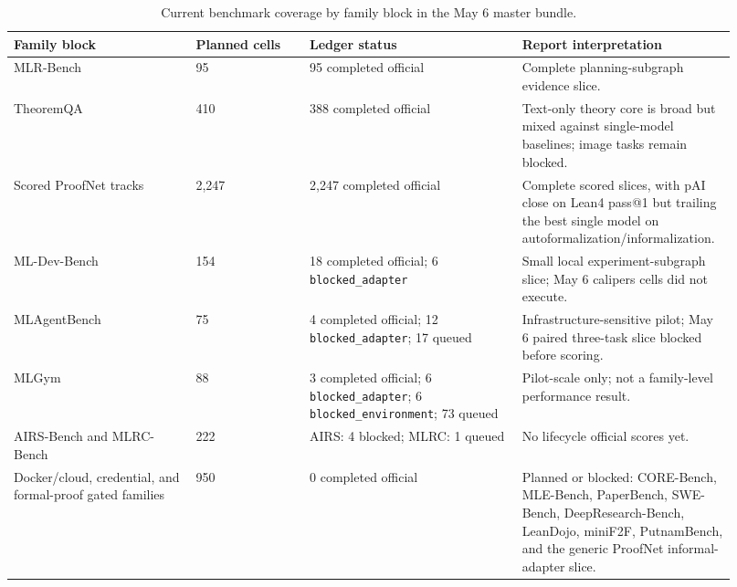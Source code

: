 \documentclass{article}
\begin{document}
\begin{table}[h]
\centering
\caption{Current benchmark coverage by family block in the May 6 master bundle.}
\label{tab:benchmark_coverage}
\small
\setlength{\tabcolsep}{3pt}
\begin{tabular}{@{}p{0.24\linewidth}p{0.15\linewidth}p{0.29\linewidth}p{0.24\linewidth}@{}}
\toprule
\textbf{Family block} & \textbf{Planned cells} & \textbf{Ledger status} & \textbf{Report interpretation} \\
\midrule
MLR-Bench & 95 & 95 completed official & Complete planning-subgraph evidence slice. \\
TheoremQA & 410 & 388 completed official & Text-only theory core is broad but mixed against single-model baselines; image tasks remain blocked. \\
Scored ProofNet tracks & 2,247 & 2,247 completed official & Complete scored slices, with pAI close on Lean4 pass@1 but trailing the best single model on autoformalization/informalization. \\
ML-Dev-Bench & 154 & 18 completed official; 6 \texttt{blocked\_adapter} & Small local experiment-subgraph slice; May 6 calipers cells did not execute. \\
MLAgentBench & 75 & 4 completed official; 12 \texttt{blocked\_adapter}; 17 queued & Infrastructure-sensitive pilot; May 6 paired three-task slice blocked before scoring. \\
MLGym & 88 & 3 completed official; 6 \texttt{blocked\_adapter}; 6 \texttt{blocked\_environment}; 73 queued & Pilot-scale only; not a family-level performance result. \\
AIRS-Bench and MLRC-Bench & 222 & AIRS: 4 blocked; MLRC: 1 queued & No lifecycle official scores yet. \\
Docker/cloud, credential, and formal-proof gated families & 950 & 0 completed official & Planned or blocked: CORE-Bench, MLE-Bench, PaperBench, SWE-Bench, DeepResearch-Bench, LeanDojo, miniF2F, PutnamBench, and the generic ProofNet informal-adapter slice. \\
\bottomrule
\end{tabular}
\end{table}
\end{document}
